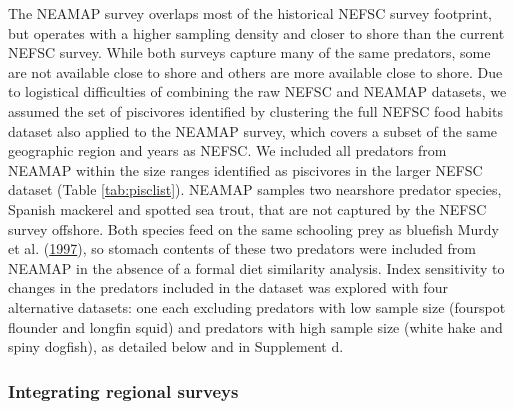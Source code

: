 \documentclass[
]{article}
\begin{document}
The NEAMAP survey overlaps most of the historical NEFSC survey footprint, but operates with a higher sampling density and closer to shore than the current NEFSC survey. While both surveys capture many of the same predators, some are not available close to shore and others are more available close to shore. Due to logistical difficulties of combining the raw NEFSC and NEAMAP datasets, we assumed the set of piscivores identified by clustering the full NEFSC food habits dataset also applied to the NEAMAP survey, which covers a subset of the same geographic region and years as NEFSC. We included all predators from NEAMAP within the size ranges identified as piscivores in the larger NEFSC dataset (Table \ref{tab:pisclist}). NEAMAP samples two nearshore predator species, Spanish mackerel and spotted sea trout, that are not captured by the NEFSC survey offshore. Both species feed on the same schooling prey as bluefish Murdy et al. (\protect\hyperlink{ref-murdy_fishes_1997}{1997}), so stomach contents of these two predators were included from NEAMAP in the absence of a formal diet similarity analysis. Index sensitivity to changes in the predators included in the dataset was explored with four alternative datasets: one each excluding predators with low sample size (fourspot flounder and longfin squid) and predators with high sample size (white hake and spiny dogfish), as detailed below and in Supplement d.~

\hypertarget{integrating-regional-surveys}{%
\subsubsection{Integrating regional surveys}\label{integrating-regional-surveys}}
\end{document}
